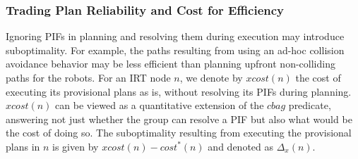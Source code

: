 \documentclass[11pt]{article}
\begin{document}










\subsubsection{Trading Plan Reliability and Cost for Efficiency}
\label{sec:tradingPlan2}
Ignoring PIFs in planning and resolving them during execution may introduce suboptimality. For example, the paths resulting from using an ad-hoc collision avoidance behavior may be less efficient than planning upfront non-colliding paths for the robots. 
For an IRT node $n$, we denote by $xcost(n)$ the cost of executing its provisional plans as is, without resolving its PIFs during planning. $xcost(n)$ can be viewed as a quantitative extension of the $cbag$ predicate, answering not just whether the group can resolve a PIF but also what would be the cost of doing so. The suboptimality resulting from executing the provisional plans in $n$ is given by $xcost(n)-cost^*(n)$ and denoted as $\Delta_x(n)$. 
\end{document}
